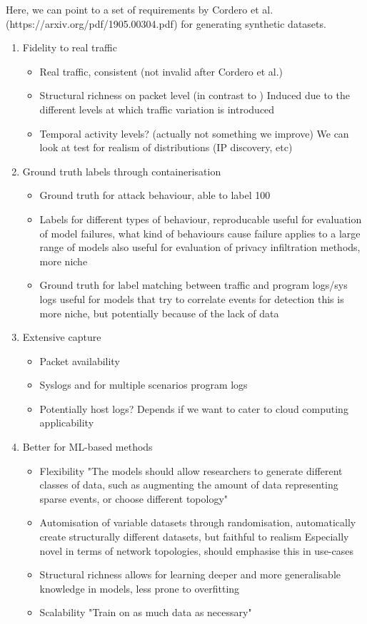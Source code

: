 \documentclass[sigconf]{acmart}
\begin{document}
Here, we can point to a set of requirements by Cordero et al. (https://arxiv.org/pdf/1905.00304.pdf) for generating synthetic datasets.
\begin{enumerate}
\item Fidelity to real traffic
\begin{itemize}
	\item Real traffic, consistent (not invalid after Cordero et al.)
	\item Structural richness on packet level (in contrast to )
		Induced due to the different levels at which traffic variation is introduced
	\item Temporal activity levels? (actually not something we improve)
			We can look at test for realism of distributions (IP discovery, etc)
\end{itemize}
\item Ground truth labels through containerisation
\begin{itemize}
	\item Ground truth for attack behaviour, able to label 100%
	\item Labels for different types of behaviour, reproducable
		useful for evaluation of model failures, what kind of behaviours cause failure
			applies to a large range of models
		also useful for evaluation of privacy infiltration methods, more niche
	\item Ground truth for label matching between traffic and program logs/sys logs
		useful for models that try to correlate events for detection
			this is more niche, but potentially because of the lack of data
\end{itemize}
\item Extensive capture
\begin{itemize}
	\item Packet availability
	\item Syslogs and for multiple scenarios program logs
	\item Potentially host logs? Depends if we want to cater to cloud computing applicability
\end{itemize}
\item Better for ML-based methods
\begin{itemize}
	\item Flexibility 
		"The models should allow researchers to generate different classes of data, such as augmenting the amount of data representing sparse events, or choose different topology"
	\item Automisation of variable datasets through randomisation, automatically create structurally different datasets, but faithful to realism
		Especially novel in terms of network topologies, should emphasise this in use-cases
	\item Structural richness 
			allows for learning deeper and more generalisable knowledge in models, less prone to overfitting
	\item Scalability
		"Train on as much data as necessary"
\end{itemize}

\end{enumerate}
\end{document}
